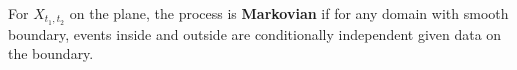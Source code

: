 For $X_{t_1,t_2}$ on the plane, the process is \textbf{Markovian} if for any domain with smooth boundary, events inside and outside are conditionally independent given data on the boundary.
